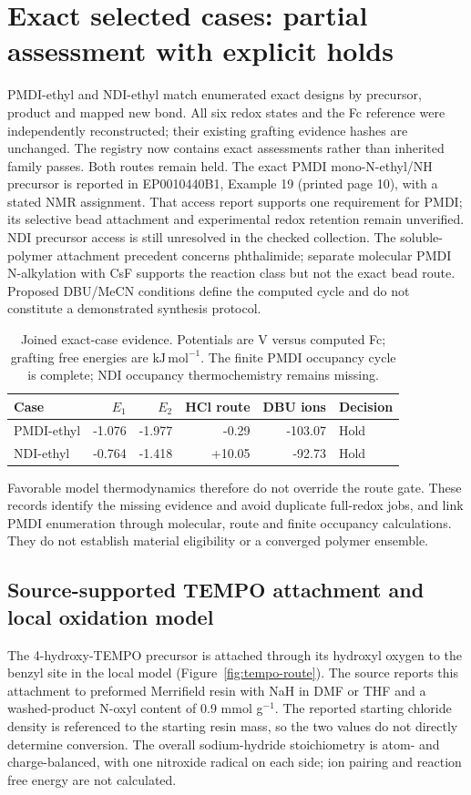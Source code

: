 \documentclass[11pt]{article}
\newcommand{\kj}{\ensuremath{\mathrm{kJ\,mol^{-1}}}}
\begin{document}
\section{Exact selected cases: partial assessment with explicit holds}
PMDI-ethyl and NDI-ethyl match enumerated exact designs by precursor, product and mapped new bond. All six redox states and the Fc reference were independently reconstructed; their existing grafting evidence hashes are unchanged. The registry now contains exact assessments rather than inherited family passes. Both routes remain held. The exact PMDI mono-N-ethyl/NH precursor is reported in EP0010440B1, Example 19 (printed page 10), with a stated NMR assignment.\cite{bochis1983} That access report supports one requirement for PMDI; its selective bead attachment and experimental redox retention remain unverified. NDI precursor access is still unresolved in the checked collection. The soluble-polymer attachment precedent concerns phthalimide; separate molecular PMDI N-alkylation with CsF supports the reaction class but not the exact bead route.\cite{hamilton1998} Proposed DBU/MeCN conditions define the computed cycle and do not constitute a demonstrated synthesis protocol.
\begin{table}[htbp]\centering
\caption{Joined exact-case evidence. Potentials are V versus computed Fc; grafting free energies are \kj. The finite PMDI occupancy cycle is complete; NDI occupancy thermochemistry remains missing.}
\begin{tabular}{lrrrrl}\toprule
Case & $E_1$ & $E_2$ & HCl route & DBU ions & Decision\\\midrule
PMDI-ethyl & -1.076 & -1.977 & -0.29 & -103.07 & Hold\\
NDI-ethyl & -0.764 & -1.418 & +10.05 & -92.73 & Hold\\\bottomrule
\end{tabular}\end{table}
Favorable model thermodynamics therefore do not override the route gate. These records identify the missing evidence and avoid duplicate full-redox jobs, and link PMDI enumeration through molecular, route and finite occupancy calculations. They do not establish material eligibility or a converged polymer ensemble.

\subsection{Source-supported TEMPO attachment and local oxidation model}
The 4-hydroxy-TEMPO precursor is attached through its hydroxyl oxygen to the benzyl site in the local model (Figure~\ref{fig:tempo-route}). The source reports this attachment to preformed Merrifield resin with NaH in DMF or THF and a washed-product N-oxyl content of 0.9 mmol g$^{-1}$.\cite{sommerlade2002tempo} The reported starting chloride density is referenced to the starting resin mass, so the two values do not directly determine conversion. The overall sodium-hydride stoichiometry is atom- and charge-balanced, with one nitroxide radical on each side; ion pairing and reaction free energy are not calculated.
\end{document}
